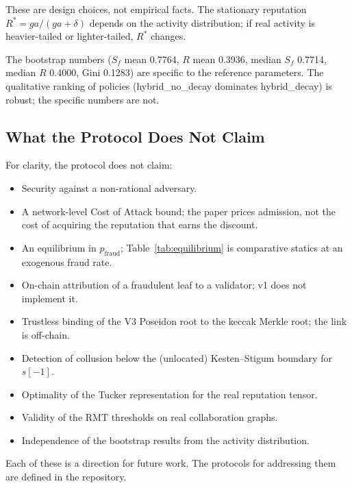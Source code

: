 \documentclass[11pt,a4paper]{article}
\numberwithin{equation}{section}
\numberwithin{table}{section}
\begin{document}
These are design choices, not empirical facts. The stationary reputation $R^* = ga/(ga + \delta)$ depends on the activity distribution; if real activity is heavier-tailed or lighter-tailed, $R^*$ changes.

The bootstrap numbers ($S_f$ mean 0.7764, $R$ mean 0.3936, median $S_f$ 0.7714, median $R$ 0.4000, Gini 0.1283) are specific to the reference parameters. The qualitative ranking of policies (hybrid\_no\_decay dominates hybrid\_decay) is robust; the specific numbers are not.

\subsection{What the Protocol Does Not Claim}
For clarity, the protocol does not claim:

\begin{itemize}[leftmargin=*]
\item Security against a non-rational adversary.
\item A network-level Cost of Attack bound; the paper prices admission, not the cost of acquiring the reputation that earns the discount.
\item An equilibrium in $p_{\mathrm{fraud}}$; Table~\ref{tab:equilibrium} is comparative statics at an exogenous fraud rate.
\item On-chain attribution of a fraudulent leaf to a validator; v1 does not implement it.
\item Trustless binding of the V3 Poseidon root to the keccak Merkle root; the link is off-chain.
\item Detection of collusion below the (unlocated) Kesten--Stigum boundary for $s[-1]$.
\item Optimality of the Tucker representation for the real reputation tensor.
\item Validity of the RMT thresholds on real collaboration graphs.
\item Independence of the bootstrap results from the activity distribution.
\end{itemize}

Each of these is a direction for future work. The protocols for addressing them are defined in the repository.
\end{document}
